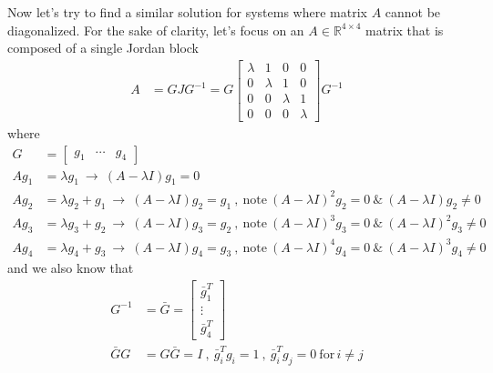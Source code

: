 \documentclass[twoside]{article}
\begin{document}
Now let's try to find a similar solution for systems where matrix $A$ cannot be diagonalized. For the sake of clarity, let's focus on an $A \in \mathbb{R}^{4 \times 4}$
matrix that is composed of a single Jordan block
%
\begin{align*}
A &= G J G^{-1} = G \begin{bmatrix} \lambda & 1 & 0 & 0 \\ 0 & \lambda & 1 & 0 \\ 0 & 0 & \lambda & 1 \\ 0 & 0 & 0 & \lambda \end{bmatrix} G^{-1} 
\end{align*}
%
\noindent where
%
\begin{align*}
     G &= \begin{bmatrix} g_1 & \cdots & g_4 \end{bmatrix}
     \\[1ex]
 A g_1 &= \lambda g_1 \ \rightarrow \ (A - \lambda I) g_1 = 0
    \\[1ex]
    A g_2 &= \lambda g_2 + g_1 \ \rightarrow \ (A - \lambda I) g_2 = g_1 \ , \ \mathrm{note} \ (A - \lambda I)^2 g_2 = 0 \ \& \ (A - \lambda I) g_2 \neq 0
        \\[1ex]
    A g_3 &= \lambda g_3 + g_2 \ \rightarrow \ (A - \lambda I) g_3 = g_2 \ , \ \mathrm{note} \ (A - \lambda I)^3 g_3 = 0 \ \& \ (A - \lambda I)^2 g_3 \neq 0
    \\[1ex]
    A g_4 &= \lambda g_4 + g_3 \ \rightarrow \ (A - \lambda I) g_4 = g_3 \ , \ \mathrm{note} \ (A - \lambda I)^4 g_4 = 0 \ \& \ (A - \lambda I)^3 g_4 \neq 0
\end{align*}
%
and we also know that
\begin{align*}
 G^{-1} &= \bar{G} =  \begin{bmatrix} \bar{g}_1^T \\ \vdots \\ \bar{g}_4^T \end{bmatrix} 
  \\[1ex]
\bar{G} G &= G \bar{G} = I \ , \ \bar{g}_i^T g_i = 1 \ , \  \bar{g}_i^T g_j = 0 \ \mathrm{for} \, i \neq j
\end{align*}
%
%
\end{document}

